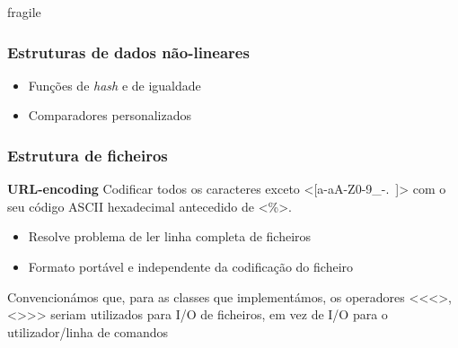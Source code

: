 \documentclass{beamer}
\def\\{}
\def\texttt#1{<#1>}
\begin{document}
\begin{frame}{fragile}
\frametitle{Estruturas de dados não-lineares}
\begin{itemize}
	\item	Funções de \textit{hash} e de igualdade
	\item	Comparadores personalizados
\end{itemize}
\begin{center} \begin{minipage}{0.95\linewidth}



\end{minipage} \end{center}
\end{frame}

\begin{frame}
\frametitle{Estrutura de ficheiros}
\begin{center}
\begin{minipage}{0.37\textwidth}
	\footnotesize
\end{minipage}%
\begin{minipage}{0.63\textwidth}
\small
\textbf{URL-encoding}\\
Codificar todos os caracteres exceto \texttt{[a-aA-Z0-9\_-.~]} com o seu código ASCII hexadecimal antecedido de \texttt{\%}.
\begin{itemize}
	\item Resolve problema de ler linha completa de ficheiros
	\item Formato portável e independente da codificação do ficheiro
\end{itemize}
Convencionámos que, para as classes que implementámos, os operadores \texttt{<<}, \texttt{>>} seriam utilizados para I/O de ficheiros, em vez de I/O para o utilizador/linha de comandos
\begin{center}\begin{minipage}{0.93\textwidth}
	
\end{minipage} \end{center}
\end{minipage}
\end{center}
\end{frame}
\end{document}
